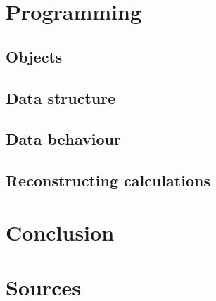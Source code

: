 \documentclass[a4paper,12pt]{report}
\begin{document}
	\chapter{Programming}
	\section{Objects}
	\section{Data structure}
	\section{Data behaviour}
	\section{Reconstructing calculations}
	\chapter{Conclusion}
	\chapter{Sources}
		
\end{document}
